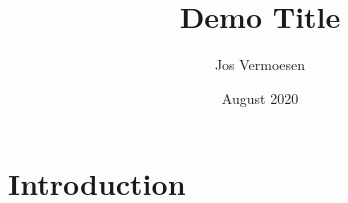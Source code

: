 \documentclass{article}
\title{Demo Title}
\author{Jos Vermoesen }
\date{August 2020}
\begin{document}
\maketitle

\section{Introduction}
\end{document}
